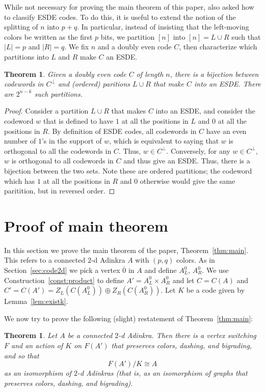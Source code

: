 \documentclass[12pt,twoside,singlespace]{article}
\numberwithin{equation}{section}
\newtheorem{thm}[equation]{Theorem}
\theoremstyle{definition}
\begin{document}
While not necessary for proving the main theorem of this paper, \cite{hubsch:weaving} also asked how to classify ESDE codes.  To do this, it is useful to extend the notion of the splitting of $n$ into $p+q$.  In particular, instead of insisting that the left-moving colors be written as the first $p$ bits, we partition $[n]$ into $[n]=L\cup R$ such that $|L|=p$ and $|R|=q$.  We fix $n$ and a doubly even code $C$, then characterize which partitions into $L$ and $R$ make $C$ an ESDE.

\begin{thm}
\label{thm:esdeclassify}
Given a doubly even code $C$ of length $n$, there is a bijection between codewords in $C^\perp$ and (ordered) paritions $L \cup R$ that make $C$ into an ESDE. There are $2^{n-k}$ such partitions. 
\end{thm}
\begin{proof}
Consider a partition $L \cup R$ that makes $C$ into an ESDE, and consider the codeword $w$ that is defined to have $1$ at all the positions in $L$ and $0$ at all the positions in $R$.  By definition of ESDE codes, all codewords in $C$ have an even number of $1$'s in the support of $w$, which is equivalent to saying that $w$ is orthogonal to all the codewords in $C$. Thus, $w \in C^\perp$.  Conversely, for any $w \in C^\perp$, $w$ is orthogonal to all codewords in $C$ and thus give an ESDE. Thus, there is a bijection between the two sets.  Note these are ordered partitions; the codeword which has $1$ at all the positions in $R$ and $0$ otherwise would give the same paritition, but in reversed order.
\end{proof}

\section{Proof of main theorem}
\label{sec:quotient}
In this section we prove the main theorem of the paper, Theorem~\ref{thm:main}.  This refers to a connected $2$-d Adinkra $A$ with $(p,q)$ colors.  As in Section~\ref{sec:code2d} we pick a vertex $\overline{0}$ in $A$ and define $A_L^0$, $A_R^0$.  We use Construction~\ref{const:product} to define $A'=A_L^0\times A_R^0$ and let $C=C(A)$ and $C'=C(A')=Z_L(C(A_L^0))\oplus Z_R(C(A_R^0))$.  Let $K$ be a code given by Lemma~\ref{lem:existk}.

We now try to prove the following (slight) restatement of Theorem~\ref{thm:main}:
\begin{thm}
\label{thm:quotient}
Let $A$ be a connected $2$-d Adinkra.  Then there is a vertex switching $F$ and an action of $K$ on $F(A')$ that preserves colors, dashing, and bigrading, and so that
\[F(A')/K\cong A\]
as an isomorphism of $2$-d Adinkras (that is, as an isomorphism of graphs that preserves colors, dashing, and bigrading).
\end{thm}
\end{document}
